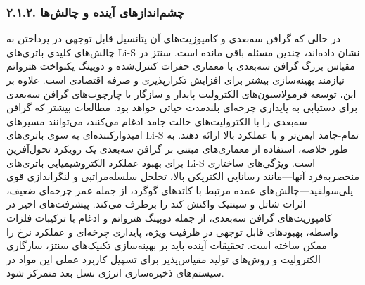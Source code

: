 \documentclass[12pt,a4paper,twocolumn]{article} %
\newcommand{\persian}[1]{\textfarsi{#1}}
\newcommand{\english}[1]{\textenglish{#1}}
\begin{document}
\subsubsection*{\persian{۲.۱.۲. چشم‌اندازهای آینده و چالش‌ها}}
\persian{
در حالی که گرافن سه‌بعدی و کامپوزیت‌های آن پتانسیل قابل توجهی در پرداختن به چالش‌های کلیدی باتری‌های \english{Li-S} نشان داده‌اند، چندین مسئله باقی مانده است. سنتز در مقیاس بزرگ گرافن سه‌بعدی با معماری حفرات کنترل‌شده و دوپینگ یکنواخت هترواتم نیازمند بهینه‌سازی بیشتر برای افزایش تکرارپذیری و صرفه اقتصادی است. علاوه بر این، توسعه فرمولاسیون‌های الکترولیت پایدار و سازگار با چارچوب‌های گرافن سه‌بعدی برای دستیابی به پایداری چرخه‌ای بلندمدت حیاتی خواهد بود. مطالعات بیشتر که گرافن سه‌بعدی را با الکترولیت‌های حالت جامد ادغام می‌کنند، می‌توانند مسیرهای امیدوارکننده‌ای به سوی باتری‌های \english{Li-S} تمام-جامد ایمن‌تر و با عملکرد بالا ارائه دهند.
}
\persian{
به طور خلاصه، استفاده از معماری‌های مبتنی بر گرافن سه‌بعدی یک رویکرد تحول‌آفرین برای بهبود عملکرد الکتروشیمیایی باتری‌های \english{Li-S} است. ویژگی‌های ساختاری منحصربه‌فرد آنها—مانند رسانایی الکتریکی بالا، تخلخل سلسله‌مراتبی و لنگراندازی قوی پلی‌سولفید—چالش‌های عمده مرتبط با کاتدهای گوگرد، از جمله عمر چرخه‌ای ضعیف، اثرات شاتل و سینتیک واکنش کند را برطرف می‌کند. پیشرفت‌های اخیر در کامپوزیت‌های گرافن سه‌بعدی، از جمله دوپینگ هترواتم و ادغام با ترکیبات فلزات واسطه، بهبودهای قابل توجهی در ظرفیت ویژه، پایداری چرخه‌ای و عملکرد نرخ را ممکن ساخته است. تحقیقات آینده باید بر بهینه‌سازی تکنیک‌های سنتز، سازگاری الکترولیت و روش‌های تولید مقیاس‌پذیر برای تسهیل کاربرد عملی این مواد در سیستم‌های ذخیره‌سازی انرژی نسل بعد متمرکز شود.
}
\end{document}
